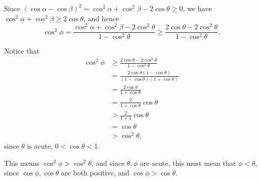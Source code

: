 \begin{enumerate}
          Since \((\cos \alpha - \cos \beta)^2 = \cos^2 \alpha + \cos^2 \beta - 2 \cos \theta \geq 0\), we have \(\cos^2 \alpha + \cos^2 \beta \geq 2 \cos \theta\), and hence
          \[
              \cos^2 \phi = \frac{\cos^2 \alpha + \cos^2 \beta - 2 \cos^2\theta}{1 - \cos^2\theta} \geq \frac{2 \cos \theta - 2 \cos^2 \theta}{1 - \cos^2 \theta}.
          \]

          Notice that
          \begin{align*}
              \cos^2 \phi & \geq \frac{2 \cos \theta - 2 \cos^2 \theta}{1 - \cos^2 \theta}               \\
                          & = \frac{2 \cos \theta (1 - \cos \theta)}{(1 - \cos \theta)(1 + \cos \theta)} \\
                          & = \frac{2 \cos \theta}{1 + \cos \theta}                                      \\
                          & = \frac{2}{1 + \cos \theta} \cos \theta                                      \\
                          & > \frac{2}{1 + 1} \cos \theta                                                \\
                          & = \cos \theta                                                                \\
                          & > \cos^2 \theta,
          \end{align*}
          since \(\theta\) is acute, \(0 < \cos \theta < 1\).

          This means \(\cos^2 \phi > \cos^2 \theta\), and since \(\theta, \phi\) are acute, this must mean that \(\phi < \theta\), since \(\cos \phi, \cos \theta\) are both positive, and \(\cos \phi > \cos \theta\).
\end{enumerate}